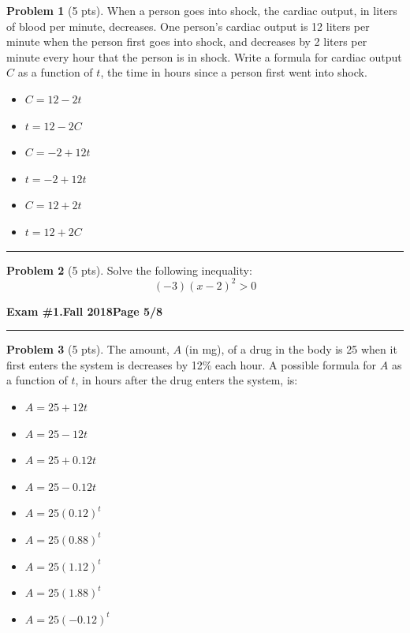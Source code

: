 \documentclass[12pt]{article}
\makeatletter
\theoremstyle{definition}
\newtheorem{problem}{Problem}
\newcommand*{\radiobutton}{%
  \@ifstar{\@radiobutton0}{\@radiobutton1}%
}
\newcommand*{\@radiobutton}[1]{%
  \begin{tikzpicture}
    \pgfmathsetlengthmacro\radius{height("X")/2}
    \draw[radius=\radius] circle;
    \ifcase#1 \fill[radius=.6*\radius] circle;\fi
  \end{tikzpicture}%
}
\makeatother
\begin{document}
\begin{problem}[5 pts]
  When a person goes into shock, the cardiac output, in liters of blood per minute, decreases. One person’s cardiac output
  is 12 liters per minute when the person first goes into shock, and decreases by 2 liters per minute every hour that the
  person is in shock. Write a formula for cardiac output $C$ as a function of $t$, the time in hours since a person first
  went into shock. 
  \begin{itemize}
  \item[\radiobutton] $C = 12 - 2t$
  \item[\radiobutton] $t = 12 - 2C$
  \item[\radiobutton] $C = -2 + 12t$
  \item[\radiobutton] $t = -2 + 12t$
  \item[\radiobutton] $C = 12 + 2t$
  \item[\radiobutton] $t = 12 + 2C$
  \end{itemize}
\end{problem}
\hrule

\begin{problem}[5 pts]
  Solve the following inequality:
  \begin{equation*} (-3)(x-2)^2 > 0 \end{equation*}
\end{problem}

\newpage

\hfill{\large\bf Exam \#1.}\hfill{\large\bf  Fall 2018}\hfill{\large\bf Page 5/8}\hrule

\bigskip

\begin{problem}[5 pts]
  The amount, $A$ (in mg), of a drug in the body is 25 when it first enters the system is decreases by 12\% each hour. A
  possible formula for $A$ as a function of $t$, in hours after the drug enters the system, is: 
  \begin{itemize}
  \item[\radiobutton] $A= 25+12t$
  \item[\radiobutton] $A=25-12t$
  \item[\radiobutton] $A=25+0.12t$
  \item[\radiobutton] $A=25-0.12t$
  \item[\radiobutton] $A=25(0.12)^t$
  \item[\radiobutton] $A=25(0.88)^t$
  \item[\radiobutton] $A=25(1.12)^t$
  \item[\radiobutton] $A=25(1.88)^t$
  \item[\radiobutton] $A=25(-0.12)^t$
  \end{itemize}
\end{problem}
\end{document}
